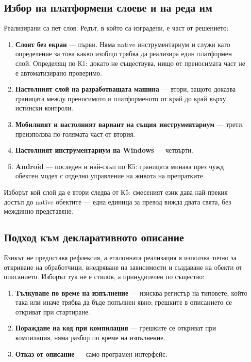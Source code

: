 \subsection{Избор на платформени слоеве и на реда им}
\label{subsec:backends}

Реализирани са пет слоя. Редът, в който са изградени, е част от решението:

\begin{enumerate}[topsep=2pt,itemsep=1pt,leftmargin=*]
\item \textbf{Слоят без екран} --- първи. Няма native инструментариум и служи като
      определение за това какво изобщо трябва да реализира един платформен слой.
      Определящ по К1: докато не съществува, нищо от преносимата част не е автоматизирано
      проверимо.
\item \textbf{Настолният слой на разработващата машина} --- втори, защото доказва границата
      между преносимото и платформеното от край до край върху истински контроли.
\item \textbf{Мобилният и настолният вариант на същия инструментариум} --- трети,
      преизползва по-голямата част от втория.
\item \textbf{Настолният инструментариум на Windows} --- четвърти.
\item \textbf{Android} --- последен и най-скъп по К5: границата минава през чужд обектен
      модел с отделно управление на живота на препратките.
\end{enumerate}

Изборът кой слой да е втори следва от К5: смесеният език дава най-прекия достъп до native
обектите --- една единица за превод вижда двата свята, без междинно представяне.

\subsection{Подход към декларативното описание}
\label{subsec:xaml_choice}

Езикът не предоставя рефлексия, а еталонната реализация я използва точно за откриване на
обработчици, внедряване на зависимости и създаване на обекти от описанието. Изборът тук не
е стилов, а принудителен по същество:

\begin{enumerate}[topsep=2pt,itemsep=1pt,leftmargin=*]
\item \textbf{Тълкуване по време на изпълнение} --- изисква регистър на типовете, който
      така или иначе трябва да бъде попълнен явно; грешките в описанието се откриват при
      стартиране.
\item \textbf{Пораждане на код при компилация} --- грешките се откриват при компилация,
      няма разбор по време на изпълнение.
\item \textbf{Отказ от описание} --- само програмен интерфейс.
\end{enumerate}

